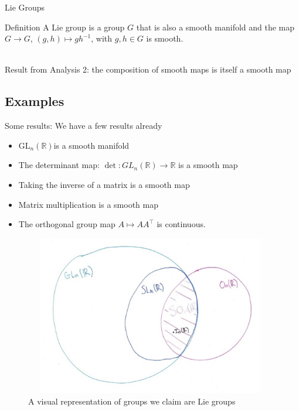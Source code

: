 \documentclass[smaller,xcolor=dvipsnames]{beamer}
\newcommand{\gln}{GL$_{n}(\mathbb{R})$}
\begin{document}
\begin{frame}{Lie Groups}
    \begin{block}{Definition}
    A Lie group is a group $G$ that is also a smooth manifold and the map $G \rightarrow G$, $(g,h)\mapsto gh^{-1}$, with $g,h\in G$ is smooth.
    \end{block}
    \pause\\
    Result from Analysis 2: the composition of smooth maps is itself a smooth map 
\end{frame}

\subsection{Examples}


\begin{frame}{Some results:}
We have a few results already
\begin{itemize}
    \item \gln is a smooth manifold
    \item The determinant map: $\det: GL_{n}(\mathbb{R}) \rightarrow \mathbb{R}$ is a smooth map
    \item Taking the inverse of a matrix is a smooth map
    \item Matrix multiplication is a smooth map
    \item The orthogonal group map $A \mapsto AA^{\top}$ is continuous. 
\end{itemize}
    
\end{frame}

\begin{frame}{}
    \begin{figure}
        \centering
        \includegraphics[height=7cm,width=11cm]{Lie_group_diagram.jpg}
        \caption{A visual representation of groups we claim are Lie groups}
        \label{fig:LieGroupFig}
    \end{figure}
\end{frame}
\end{document}
